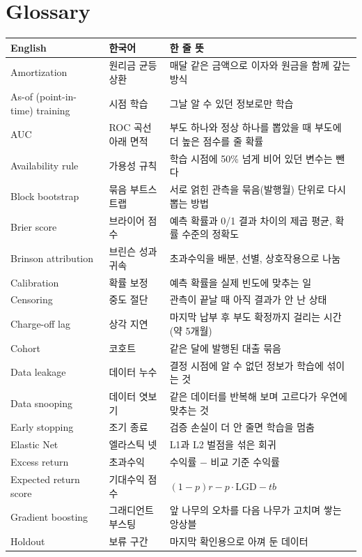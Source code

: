 \chapter*{Glossary}
{\small
\begin{longtable}{@{}p{43mm}p{40mm}p{70mm}@{}}\toprule
English & 한국어 & 한 줄 뜻\\\midrule\endhead
Amortization & 원리금 균등 상환 & 매달 같은 금액으로 이자와 원금을 함께 갚는 방식\\
As-of (point-in-time) training & 시점 학습 & 그날 알 수 있던 정보로만 학습\\
AUC & ROC 곡선 아래 면적 & 부도 하나와 정상 하나를 뽑았을 때 부도에 더 높은 점수를 줄 확률\\
Availability rule & 가용성 규칙 & 학습 시점에 50\% 넘게 비어 있던 변수는 뺀다\\
Block bootstrap & 묶음 부트스트랩 & 서로 얽힌 관측을 묶음(발행월) 단위로 다시 뽑는 방법\\
Brier score & 브라이어 점수 & 예측 확률과 0/1 결과 차이의 제곱 평균, 확률 수준의 정확도\\
Brinson attribution & 브린슨 성과 귀속 & 초과수익을 배분, 선별, 상호작용으로 나눔\\
Calibration & 확률 보정 & 예측 확률을 실제 빈도에 맞추는 일\\
Censoring & 중도 절단 & 관측이 끝날 때 아직 결과가 안 난 상태\\
Charge-off lag & 상각 지연 & 마지막 납부 후 부도 확정까지 걸리는 시간(약 5개월)\\
Cohort & 코호트 & 같은 달에 발행된 대출 묶음\\
Data leakage & 데이터 누수 & 결정 시점에 알 수 없던 정보가 학습에 섞이는 것\\
Data snooping & 데이터 엿보기 & 같은 데이터를 반복해 보며 고르다가 우연에 맞추는 것\\
Early stopping & 조기 종료 & 검증 손실이 더 안 줄면 학습을 멈춤\\
Elastic Net & 엘라스틱 넷 & L1과 L2 벌점을 섞은 회귀\\
Excess return & 초과수익 & 수익률 $-$ 비교 기준 수익률\\
Expected return score & 기대수익 점수 & $(1-p)r - p\cdot\mathrm{LGD} - tb$\\
Gradient boosting & 그래디언트 부스팅 & 앞 나무의 오차를 다음 나무가 고치며 쌓는 앙상블\\
Holdout & 보류 구간 & 마지막 확인용으로 아껴 둔 데이터\\

\end{longtable}}
